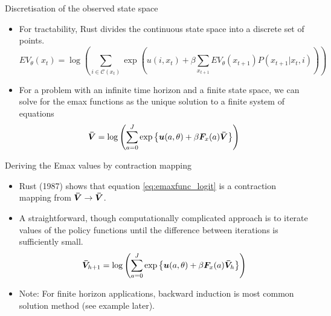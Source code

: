 \documentclass[aspectratio=169]{beamer}
\begin{document}
	\begin{frame}{Discretisation of the observed state space}
		\begin{itemize}
			\itemsep1em
			\item For tractability, Rust divides the continuous state space into a discrete set of points.
			\begin{equation} \label{eq:emaxfunc_logit}
				EV_\theta(x_t) = \log \left( \sum_{i \in \mathcal{C}(x_t)} \exp \left( u(i,x_t) + \beta  \sum_{x_{t+1}} EV_\theta(x_{t+1})P(x_{t+1}|x_t,i) \right) \right)
			\end{equation}
			\item For a problem with an infinite time horizon and a finite state space, we can solve for the emax functions as the unique solution to a finite system of equations
			\begin{equation} \label{eq:valuefunciteration}
				\bm{\Bar{V}} = \log \left(\sum_{a=0}^J \exp \left\{ \bm{u}(a,\theta) + \beta \bm{F}_x(a) \bm{\Bar{V}} \right\} \right)
			\end{equation}
		\end{itemize}
	\end{frame}
	
	\begin{frame}{Deriving the Emax values by contraction mapping}
		\begin{itemize}
			\itemsep1em
			\item Rust (1987) shows that equation \ref{eq:emaxfunc_logit} is a contraction mapping from $\bm{\Bar{V}} \rightarrow \bm{\Bar{V}}$.
			\item A straightforward, though computationally complicated approach is to iterate values of the policy functions until the difference between iterations is sufficiently small.
			\begin{equation}\label{eq:emax_iter}
				\bm{\Bar{V}}_{h+1} = \log \left(\sum_{a=0}^J \exp \left\{ \bm{u}(a,\theta) + \beta \bm{F}_x(a) \bm{\Bar{V}}_h \right\} \right)
			\end{equation}
			\item Note: For finite horizon applications, backward induction is most common solution method (see example later).
		\end{itemize}
	\end{frame}
	
\end{document}
